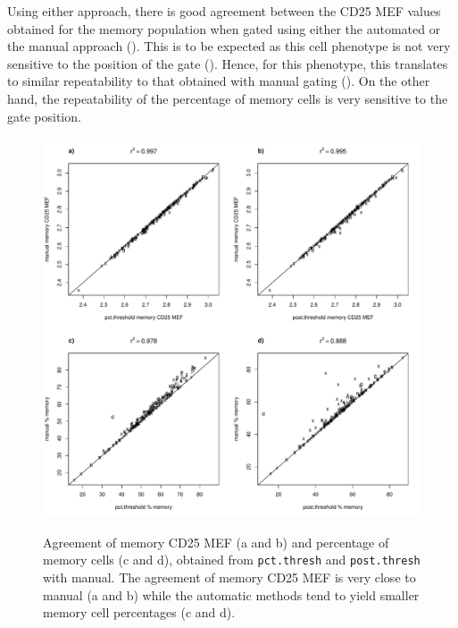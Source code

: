 Using either approach, there is good agreement between the CD25 MEF values obtained for the memory population when gated using either the automated
or the manual approach ().
This is to be expected as this cell phenotype is not very sensitive to the position of the  gate
().  
Hence, for this phenotype, this translates to similar repeatability to that obtained with manual gating ().
On the other hand, the repeatability of the percentage of memory cells is very sensitive to the gate position.


\begin{figure}
 \centering
\begin{minipage}{.8\textwidth}
 \includegraphics[width=\linewidth]{figures/memory-auto-manual-agreement-thresholds.pdf}
\end{minipage}
 {Agreement of memory CD25 MEF (a and b) and percentage of memory cells (c and d), obtained from \texttt{pct.thresh} and \texttt{post.thresh} with manual.}
 {
   The agreement of memory CD25 MEF is very close to manual (a and b) while the automatic methods tend to yield smaller memory cell percentages (c and d).
 }
\end{figure} 

